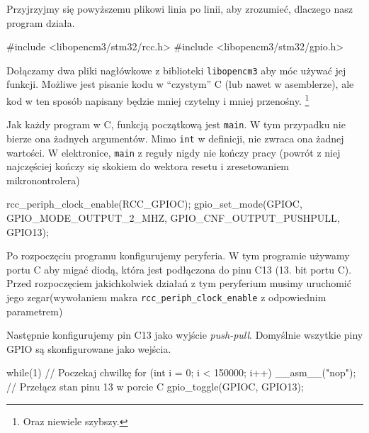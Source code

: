 \documentclass{pdfBooklets}
\begin{document}
Przyjrzyjmy się powyższemu plikowi linia po linii, aby zrozumieć, dlaczego nasz program działa.

\begin{CodeFrame*}[c]{}
#include <libopencm3/stm32/rcc.h>
#include <libopencm3/stm32/gpio.h>

\end{CodeFrame*}

Dołączamy dwa pliki nagłówkowe z biblioteki \Verb$libopencm3$ aby móc używać jej funkcji. Możliwe jest pisanie kodu w ``czystym'' C
(lub nawet w asemblerze), ale kod w ten sposób napisany będzie mniej czytelny i mniej przenośny.
\footnote{Oraz niewiele szybszy.}

\begin{CodeFrame*}[c]{}
int main() { 
\end{CodeFrame*}

Jak każdy program w C, funkcją początkową jest \verb$main$. W tym przypadku nie bierze ona żadnych argumentów. Mimo \Verb$int$ w
definicji, nie zwraca ona żadnej wartości. W elektronice, \Verb$main$ z reguły nigdy nie kończy pracy (powrót z niej najczęściej
kończy się skokiem do wektora resetu i zresetowaniem mikronontrolera)

\begin{CodeFrame*}[c]{}
  rcc_periph_clock_enable(RCC_GPIOC);
  gpio_set_mode(GPIOC, GPIO_MODE_OUTPUT_2_MHZ, GPIO_CNF_OUTPUT_PUSHPULL, GPIO13);
\end{CodeFrame*}

Po rozpoczęciu programu konfigurujemy peryferia. W tym programie używamy portu C aby migać diodą, która jest podłączona do pinu C13
(13. bit portu C). Przed rozpoczęciem jakichkolwiek działań z tym peryferium musimy uruchomić jego zegar\footnotemark (wywołaniem makra
\Verb$rcc_periph_clock_enable$ z odpowiednim parametrem)

Następnie konfigurujemy pin C13 jako wyjście \textit{push-pull}. Domyślnie wszytkie piny GPIO są skonfigurowane jako wejścia.


\begin{CodeFrame*}[c]{}
  while(1){
    // Poczekaj chwilkę
    for (int i = 0; i < 150000; i++) __asm__("nop");
    // Przełącz stan pinu 13 w porcie C
    gpio_toggle(GPIOC, GPIO13); 
  }
\end{CodeFrame*}
\end{document}
